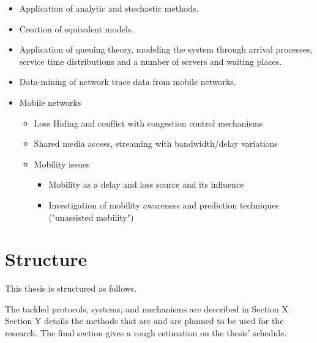 \begin{itemize}
\item Application of analytic and stochastic methods.
\item Creation of equivalent models.
\item Application of queuing theory, modeling the system through arrival processes, service time distributions and a number of servers and waiting places.
\item Data-mining of network trace data from mobile networks.

\item Mobile networks
 \begin{itemize}
   \item Loss Hiding and conflict with congestion control mechanisms
   \item Shared media access, streaming with bandwidth/delay variations
   \item Mobility issues
     \begin{itemize}
       \item Mobility as a delay and loss source and its influence
       \item Investigation of mobility awareness and prediction techniques ("unassisted mobility")
     \end{itemize}
 \end{itemize}

\end{itemize}




\section{Structure}

This thesis is structured as follows.

The tackled protocols, systems, and mechanisms are described in Section X. Section Y details the methods that are and are planned to be used for the research. The final section gives a rough estimation on the thesis' schedule.




